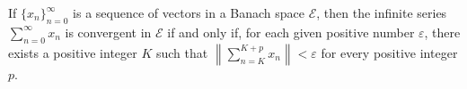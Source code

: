 If $\{x_n\}_{n=0}^{\infty}$ is a sequence of vectors in a Banach space $\mathcal{E}$, then the infinite series $\sum_{n=0}^{\infty} x_n$ is convergent in $\mathcal{E}$ if and only if, for each given positive number $\varepsilon$, there exists a positive integer $K$ such that $\left\|\sum_{n=K}^{K+p} x_n\right\| < \varepsilon$ for every positive integer $p$.
